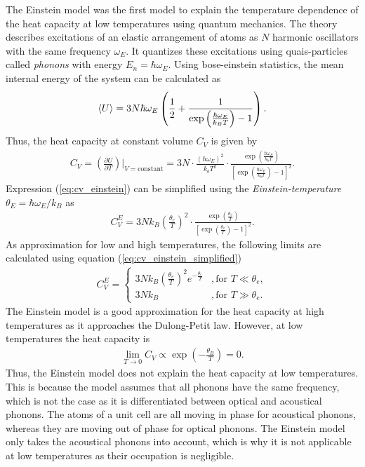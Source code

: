 The Einstein model was the first model to explain the temperature dependence of the heat capacity at low temperatures using quantum mechanics.
The theory describes excitations of an elastic arrangement of atoms as $N$ harmonic oscillators with the same frequency $\omega_E$.
It quantizes these excitations using quais-particles called \textit{phonons} with energy $E_n = \hbar\omega_E$.
Using bose-einstein statistics, the mean internal energy of the system can be calculated as
\begin{align}
    \braket U=3N\hbar\omega_E\left( \frac12+\frac1{\exp\left(\frac{\hbar\omega_E}{k_BT}\right)-1}\right).
    \label{eq:U_einstein}
\end{align}
Thus, the heat capacity at constant volume $C_V$ is given by
\begin{align}
    C_V=\left(\frac{\partial U}{\partial T}\right)\Big|_{V=\text{constant}} = 3N\cdot\frac{(\hbar\omega_E)^2}{k_bT^2}\cdot\frac{\exp\left(\frac{\hbar\omega_E}{k_bT}\right)}{\left[\exp\left(\frac{\hbar\omega_E}{k_bT}\right)-1\right]^2}.
    \label{eq:cv_einstein}
\end{align}
Expression (\ref{eq:cv_einstein}) can be simplified using the \textit{Einstein-temperature} $\theta_E=\hbar\omega_E/k_B$ as
\begin{align}
    C_V^E=3Nk_B\left(\frac{\theta_e}{T}\right)^2 \cdot 
    \frac{\exp\left(\frac{\theta_e}{T}\right)}{\left[\exp\left(\frac{\theta_e}{T}\right)-1\right]^2}.
    \label{eq:cv_einstein_simplified}
\end{align}
As approximation for low and high temperatures, the following limits are calculated using equation (\ref{eq:cv_einstein_simplified})
\begin{align}
    C_V^E=\begin{cases}
        3Nk_B\left(\frac{\theta_e}{T}\right)^2e^{-\frac{\theta_e}{T}} &,\text{for } T\ll\theta_e, \\
        3Nk_B &,\text{for } T\gg\theta_e.
        \end{cases}
    \label{eq:cv_einstein_limits}
\end{align}
The Einstein model is a good approximation for the heat capacity at high temperatures as it approaches the Dulong-Petit law.
However, at low temperatures the heat capacity is 
\begin{align}
    \lim_{T \to 0}C_V\propto \exp\left(-\frac{\theta_B}{T}\right) =0.
    \label{eq:cv_einstein_low}
\end{align}
Thus, the Einstein model does not explain the heat capacity at low temperatures.
This is because the model assumes that all phonons have the same frequency, which is not the case as it is differentiated between optical and acoustical phonons.
The atoms of a unit cell are all moving in phase for acoustical phonons, whereas they are moving out of phase for optical phonons.
The Einstein model only takes the acoustical phonons into account, which is why it is not applicable at low temperatures as their occupation is negligible. %

